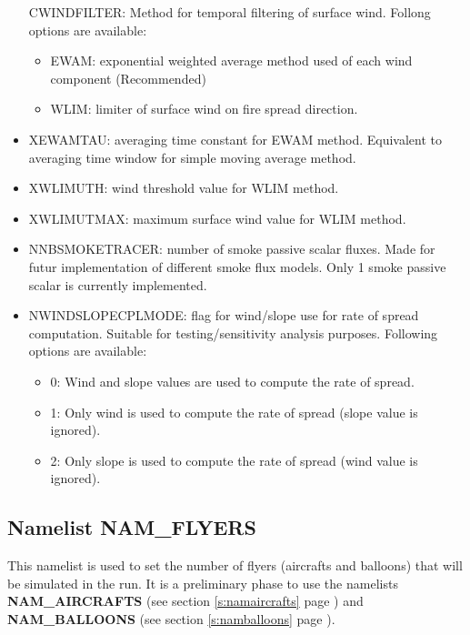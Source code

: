 \begin{itemize}
  CWINDFILTER: Method for temporal filtering of surface wind. Follong options are available:
  \begin{itemize}
    \item EWAM: exponential weighted average method used of each wind component (Recommended)
    \item WLIM: limiter of surface wind on fire spread direction.
  \end{itemize}
  \item
  XEWAMTAU: averaging time constant for EWAM method. Equivalent to averaging time window for simple moving average method.
  \item
  XWLIMUTH: wind threshold value for WLIM method.
  \item
  XWLIMUTMAX: maximum surface wind value for WLIM method.
  \item
  NNBSMOKETRACER: number of smoke passive scalar fluxes. Made for futur implementation of different smoke flux models. Only 1 smoke passive scalar is currently implemented.
  \item
  NWINDSLOPECPLMODE: flag for wind/slope use for rate of spread computation. Suitable for testing/sensitivity analysis purposes. Following options are available:
  \begin{itemize}
    \item 0: Wind and slope values are used to compute the rate of spread.
    \item 1: Only wind is used to compute the rate of spread (slope value is ignored).
    \item 2: Only slope is used to compute the rate of spread (wind value is ignored).
  \end{itemize}
\end{itemize}


\subsection{Namelist NAM\_FLYERS}\label{s:namflyers}
%
This namelist is used to set the number of flyers (aircrafts and balloons) that will be simulated in the run. It is a preliminary phase to use the namelists \textbf{NAM\_AIRCRAFTS} (see section \ref{s:namaircrafts} page \pageref{s:namaircrafts}) and \textbf{NAM\_BALLOONS} (see section \ref{s:namballoons} page \pageref{s:namballoons}).

